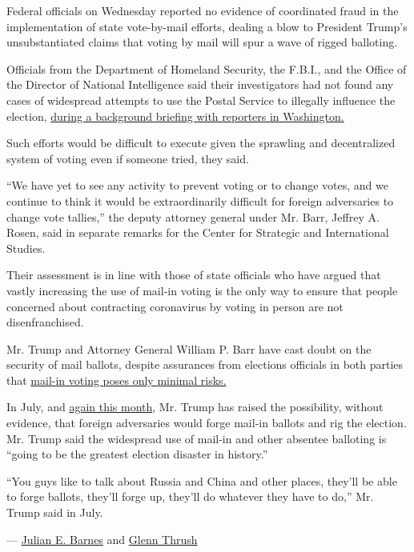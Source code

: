 Federal officials on Wednesday reported no evidence of coordinated fraud
in the implementation of state vote-by-mail efforts, dealing a blow to
President Trump's unsubstantiated claims that voting by mail will spur a
wave of rigged balloting.

Officials from the Department of Homeland Security, the F.B.I., and the
Office of the Director of National Intelligence said their investigators
had not found any cases of widespread attempts to use the Postal Service
to illegally influence the election,
\href{https://www.nytimes3xbfgragh.onion/2020/08/26/us/politics/mail-in-voting-foreign-intervention.html}{during
a background briefing with reporters in Washington.}

Such efforts would be difficult to execute given the sprawling and
decentralized system of voting even if someone tried, they said.

``We have yet to see any activity to prevent voting or to change votes,
and we continue to think it would be extraordinarily difficult for
foreign adversaries to change vote tallies,'' the deputy attorney
general under Mr. Barr, Jeffrey A. Rosen, said in separate remarks for
the Center for Strategic and International Studies.

Their assessment is in line with those of state officials who have
argued that vastly increasing the use of mail-in voting is the only way
to ensure that people concerned about contracting coronavirus by voting
in person are not disenfranchised.

Mr. Trump and Attorney General William P. Barr have cast doubt on the
security of mail ballots, despite assurances from elections officials in
both parties that
\href{https://thehill.com/opinion/campaign/494189-lets-put-the-vote-by-mail-fraud-myth-to-rest}{mail-in
voting poses only minimal risks.}

In July, and
\href{https://www.whitehouse.gov/briefings-statements/remarks-president-trump-press-briefing-august-13-2020/}{again
this month}, Mr. Trump has raised the possibility, without evidence,
that foreign adversaries would forge mail-in ballots and rig the
election. Mr. Trump said the widespread use of mail-in and other
absentee balloting is ``going to be the greatest election disaster in
history.''

``You guys like to talk about Russia and China and other places, they'll
be able to forge ballots, they'll forge up, they'll do whatever they
have to do,'' Mr. Trump said in July.

--- \href{https://www.nytimes3xbfgragh.onion/by/julian-e-barnes}{Julian
E. Barnes} and
\href{https://www.nytimes3xbfgragh.onion/by/glenn-thrush}{Glenn Thrush}

